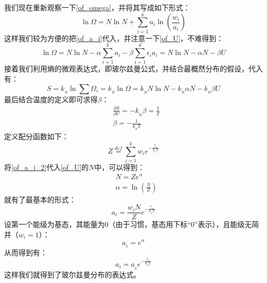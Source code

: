 \begin{prove}
            我们现在重新观察一下\ref{of_omega}，并将其写成如下形式：
            \begin{equation}
                \ln\Omega = N\ln N + \sum_{i = 1}^{k} a_i \ln(\frac{w_i}{a_i})
            \end{equation}
            这样我们较为方便的把\ref{of_a_i}代入，并注意一下\ref{of_U}，不难得到：
            \begin{equation}
                \ln\Omega = N\ln N - \alpha \sum_{i = 1}^{k} a_i -\beta \sum_{i = 1}^{k}\epsilon_i a_i = N\ln N -\alpha N - \beta U  
            \end{equation}
            接着我们利用熵的微观表达式，即玻尔兹曼公式，并结合最概然分布的假设，代入有：
            \begin{equation}
                S = k_{_B}\ln\sum \Omega_i = k_{_B}\ln\Omega =  k_{_B}N\ln N -k_{_B}\alpha N - k_{_B}\beta U
                \label{of_S}
            \end{equation}
            最后结合温度的定义即可求得$\beta$：
            \begin{equation}
                \begin{aligned}
                    &\frac{\partial S}{\partial U} = -k_{_B}\beta =\frac{1}{T}\\
                    &\beta = -\frac{1}{k_{_B}T}
                \end{aligned}
            \end{equation}
            定义配分函数如下：
            \begin{equation}
                Z \overset{def}{=} \sum_{i=1}^{k}w_i e^{-\tfrac{\epsilon_i}{k_{_B}T}}
            \end{equation}
            将\ref{of_a_i_2}代入\ref{of_U}的$N$中，可以得到：
            \begin{equation}
                \begin{aligned}
                    &N = Ze^{\alpha} \\
                    &\alpha = \ln\left(\frac{N}{Z}\right)
                \end{aligned}
            \end{equation}
            就有了最基本的形式：
            \begin{equation}
                a_i = \frac{w_{i}N}{Z} e^{-\tfrac{\epsilon_i}{k_{_B}T}}
                \label{of_a_i_3}
            \end{equation}
            设第一个能级为基态，其能量为0（由于习惯，基态用下标“0”表示），且能级无简并（$w_i=1$）：
            \begin{equation}
                a_{_0} = e^{\alpha}
            \end{equation}
            从而得到有：
            \begin{equation}
                a_i = a_{_0} e^{-\tfrac{\epsilon_i}{k_{_B}T}} 
            \end{equation}
            这样我们就得到了玻尔兹曼分布的表达式。
        \end{prove}

